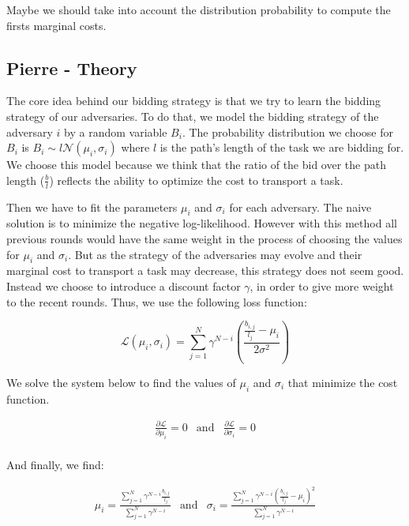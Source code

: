 \documentclass[11pt]{article}
\begin{document}
Maybe we should take into account the distribution probability to compute the firsts marginal costs.

\subsection{Pierre - Theory}

The core idea behind our bidding strategy is that we try to learn the bidding strategy of our adversaries. To do that, we model the bidding strategy of the adversary $i$ by a random variable $B_i$. The probability distribution we choose for $B_i$ is $B_i \sim l\mathcal{N}(\mu_i, \sigma_i)$ where $l$ is the path's length of the task we are bidding for. We choose this model because we think that the ratio of the bid over the path length ($\frac{b}{l}$) reflects the ability to optimize the cost to transport a task.

Then we have to fit the parameters $\mu_i$ and $\sigma_i$ for each adversary. The naive solution is to minimize the negative log-likelihood. However with this method all previous rounds would have the same weight in the process of choosing the values for $\mu_i$ and $\sigma_i$. But as the strategy of the adversaries may evolve and their marginal cost to transport a task may decrease, this strategy does not seem good. Instead we choose to introduce a discount factor $\gamma$, in order to give more weight to the recent rounds. Thus, we use the following loss function:

$$
\mathcal{L}(\mu_i, \sigma_i) = \sum_{j=1}^{N}{\gamma^{N-i}\left(\frac{\frac{b_{i,j}}{l_j} - \mu_i}{2\sigma^2}\right)}
$$

We solve the system below to find the values of $\mu_i$ and $\sigma_i$ that minimize the cost function.

$$
\begin{array}{ccc}
\frac{\partial \mathcal{L}}{\partial \mu_i} = 0 & 
\text{and} &
\frac{\partial \mathcal{L}}{\partial \sigma_i} = 0 \\
\end{array}
$$

And finally, we find:

\begin{equation}
\begin{array}{ccc}
\mu_i = \frac{\sum_{j = 1}^{N}{\gamma^{N-i}\frac{b_{i,j}}{l_j}}}{\sum_{j = 1}^{N}{\gamma^{N-i}}} &
\text{and} &
\sigma_i = \frac{\sum_{j = 1}^{N}{\gamma^{N-i}\left(\frac{b_{i,j}}{l_j}-\mu_i\right)^2}}{\sum_{j = 1}^{N}{\gamma^{N-i}}} \\
\end{array}
\label{update}
\end{equation}
\end{document}
